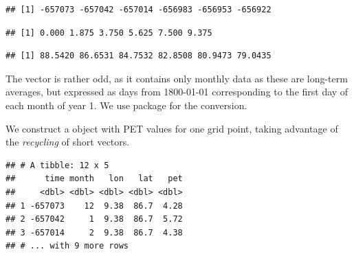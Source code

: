 \documentclass[krantz2]{krantz}\usepackage{knitr}
\begin{document}
\begin{knitrout}\footnotesize
{}\color{fgcolor}\begin{kframe}
\begin{alltt}
 \hlkwb{<-}  \hlstd{)}
\end{alltt}
\begin{verbatim}
## [1] -657073 -657042 -657014 -656983 -656953 -656922
\end{verbatim}
\begin{alltt}
 \hlkwb{<-}   \hlstd{)}
\end{alltt}
\begin{verbatim}
## [1] 0.000 1.875 3.750 5.625 7.500 9.375
\end{verbatim}
\begin{alltt}
 \hlkwb{<-}  \hlstd{)}
\end{alltt}
\begin{verbatim}
## [1] 88.5420 86.6531 84.7532 82.8508 80.9473 79.0435
\end{verbatim}
\end{kframe}
\end{knitrout}

The  vector is rather odd, as it contains only monthly data as these are long-term averages, but expressed as days from 1800-01-01 corresponding to the first day of each month of year 1. We use package  for the conversion.

We construct a  object with PET values for one grid point, taking advantage of the \emph{recycling} of short vectors.

\begin{knitrout}\footnotesize
{}\color{fgcolor}\begin{kframe}
\begin{alltt}
 \hlkwb{<-}
    \hlstd{(} \hlstd{=}  \hlstd{),}
            \hlstd{=} \hlstd{(}\hlstd{(}\hlstd{)} \hlopt{+} 
            \hlstd{= longitude[}\hlstd{],}
            \hlstd{= latitude[}\hlstd{],}
            \hlstd{=}  \hlstd{)[}\hlstd{,} \hlstd{, ]}
           \hlstd{)}
\end{alltt}
\begin{verbatim}
## # A tibble: 12 x 5
##      time month   lon   lat   pet
##     <dbl> <dbl> <dbl> <dbl> <dbl>
## 1 -657073    12  9.38  86.7  4.28
## 2 -657042     1  9.38  86.7  5.72
## 3 -657014     2  9.38  86.7  4.38
## # ... with 9 more rows
\end{verbatim}
\end{kframe}
\end{knitrout}
\end{document}
